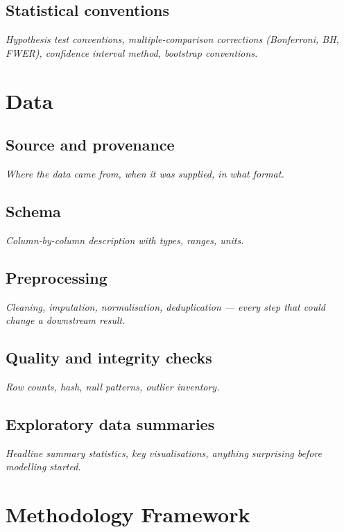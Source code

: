 \documentclass[12pt,a4paper]{article}
\newcommand{\ph}[1]{\textit{\textcolor{phgray}{#1}}}
\begin{document}
\subsection{Statistical conventions}
\ph{Hypothesis test conventions, multiple-comparison corrections (Bonferroni, BH, FWER), confidence interval method, bootstrap conventions.}

\section{Data}
\subsection{Source and provenance}
\ph{Where the data came from, when it was supplied, in what format.}

\subsection{Schema}
\ph{Column-by-column description with types, ranges, units.}

\subsection{Preprocessing}
\ph{Cleaning, imputation, normalisation, deduplication — every step that could change a downstream result.}

\subsection{Quality and integrity checks}
\ph{Row counts, hash, null patterns, outlier inventory.}

\subsection{Exploratory data summaries}
\ph{Headline summary statistics, key visualisations, anything surprising before modelling started.}

\section{Methodology Framework}
\end{document}
